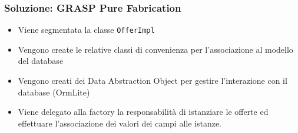 \begin{frame}
    \frametitle{Soluzione: GRASP Pure Fabrication}
    \begin{minipage}{.48\textwidth}
        \begin{itemize}
            \item<1-> Viene segmentata la classe \texttt{OfferImpl}
            \item <2-> Vengono create le relative classi di convenienza per l'associazione al modello del database
            \item <3-> Vengono creati dei Data Abstraction Object per gestire l'interazione con il database (OrmLite)
            \item Viene delegato alla factory la responsabilità di istanziare le offerte ed effettuare l'associazione dei valori dei campi alle istanze.
        \end{itemize}
    \end{minipage}
    \begin{minipage}{.47\textwidth}
        \begin{figure}
            \centering
        \end{figure}
    \end{minipage}
\end{frame}
